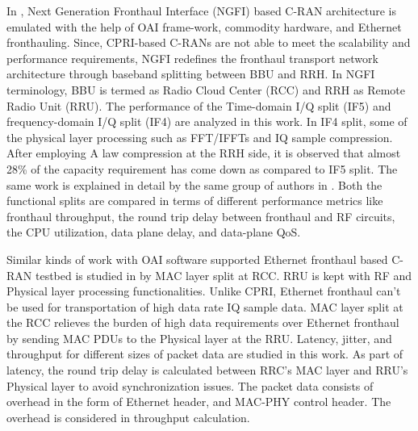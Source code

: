 \begin{multicols}{2}
\begin{itemize}
In \cite{art3-key74}, Next Generation Fronthaul Interface (NGFI) based C-RAN architecture is emulated with the help of OAI frame-work, commodity hardware, and Ethernet fronthauling. Since, CPRI-based C-RANs are not able to meet the scalability and performance requirements, NGFI redefines the fronthaul transport network architecture through baseband splitting between BBU and RRH. In NGFI terminology, BBU is termed as Radio Cloud Center (RCC) and RRH as Remote Radio Unit (RRU). The performance of the Time-domain I/Q split (IF5) and frequency-domain I/Q split (IF4) are analyzed in this work. In IF4 split, some of the physical layer processing such as FFT/IFFTs and IQ sample compression. After employing A law compression at the RRH side, it is observed that almost 28\% of the capacity requirement has come down as compared to IF5 split. The same work is explained in detail by the same group of authors in \cite{art3-key75}. Both the functional splits are compared in terms of different performance metrics like fronthaul throughput, the round trip delay between fronthaul and RF circuits, the CPU utilization, data plane delay, and data-plane QoS.

Similar kinds of work with OAI software supported Ethernet fronthaul based C-RAN testbed is studied in \cite{art3-key76} by MAC layer split at RCC. RRU is kept with RF and Physical layer processing functionalities. Unlike CPRI, Ethernet fronthaul can’t be used for transportation of high data rate IQ sample data. MAC layer split at the RCC relieves the burden of high data requirements over Ethernet fronthaul by sending MAC PDUs to the Physical layer at the RRU. Latency, jitter, and throughput for different sizes of packet data are studied in this work. As part of latency, the round trip delay is calculated between RRC’s MAC layer and RRU’s Physical layer to avoid synchronization issues. The packet data consists of overhead in the form of Ethernet header, and MAC-PHY control header. The overhead is considered in throughput calculation. 


\end{itemize}
\end{multicols}
